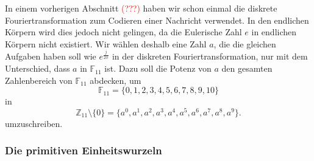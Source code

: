 In einem vorherigen Abschnitt \textcolor{red}{(???)} haben wir schon einmal die diskrete Fouriertransformation zum Codieren einer Nachricht verwendet. In den endlichen Körpern wird dies jedoch nicht gelingen, da die Eulerische Zahl $e$ in endlichen Körpern nicht existiert.
Wir wählen deshalb eine Zahl $a$, die die gleichen Aufgaben haben soll wie $e^{\frac{j}{2 \pi}}$ in der diskreten Fouriertransformation, nur mit dem Unterschied, dass $a$ in $\mathbb{F}_{11}$ ist. Dazu soll die Potenz von $a$ den gesamten Zahlenbereich von $\mathbb{F}_{11}$ abdecken, um
\[
\mathbb{F}_{11} = \{0,1,2,3,4,5,6,7,8,9,10\}
\]
in
\[
\mathbb{Z}_{11}\setminus\{0\} = \{a^0, a^1, a^2, a^3, a^4, a^5, a^6, a^7, a^8, a^9\}.
\]
umzuschreiben.
%

\subsubsection{Die primitiven Einheitswurzeln
	\label{reedsolomon:subsection:primsqrt}}

